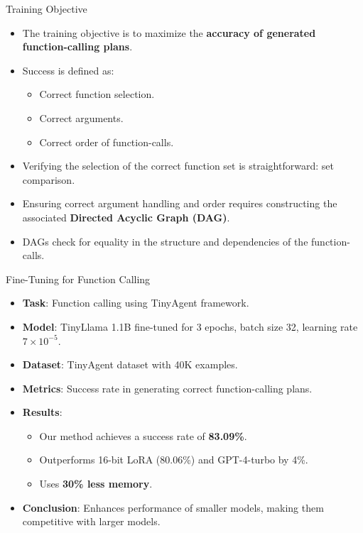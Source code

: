 \documentclass{beamer}
\begin{document}
\begin{frame}{Training Objective}
    \begin{itemize}
        \item The training objective is to maximize the \textbf{accuracy of generated function-calling plans}.
        \item Success is defined as:
        \begin{itemize}
            \item Correct function selection.
            \item Correct arguments.
            \item Correct order of function-calls.
        \end{itemize}
        \item Verifying the selection of the correct function set is straightforward: set comparison.
        \item Ensuring correct argument handling and order requires constructing the associated \textbf{Directed Acyclic Graph (DAG)}.
        \item DAGs check for equality in the structure and dependencies of the function-calls.
    \end{itemize}
\end{frame}

\begin{frame}{Fine-Tuning for Function Calling}
    \begin{itemize}
        \item \textbf{Task}: Function calling using TinyAgent framework.
        \item \textbf{Model}: TinyLlama 1.1B fine-tuned for 3 epochs, batch size 32, learning rate \(7 \times 10^{-5}\).
        \item \textbf{Dataset}: TinyAgent dataset with 40K examples.
        \item \textbf{Metrics}: Success rate in generating correct function-calling plans.
        \item \textbf{Results}:
            \begin{itemize}
                \item Our method achieves a success rate of \textbf{83.09\%}.
                \item Outperforms 16-bit LoRA (80.06\%) and GPT-4-turbo by 4\%.
                \item Uses \textbf{30\% less memory}.
            \end{itemize}
        \item \textbf{Conclusion}: Enhances performance of smaller models, making them competitive with larger models.
    \end{itemize}
\end{frame}
\end{document}
